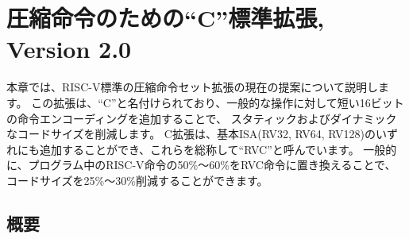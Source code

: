 \begin{comment}
\chapter{``C'' Standard Extension for Compressed Instructions, Version
2.0}
\end{comment}
\chapter{圧縮命令のための``C''標準拡張, Version 2.0}
\label{compressed}

\begin{comment}
This chapter describes the current proposal for the RISC-V
standard compressed instruction-set extension, named ``C'', which
reduces static and dynamic code size by adding short 16-bit
instruction encodings for common operations.  The C extension can be
added to any of the base ISAs (RV32, RV64, RV128), and we use the
generic term ``RVC'' to cover any of these.  Typically, 50\%--60\% of
the RISC-V instructions in a program can be replaced with RVC
instructions, resulting in a 25\%--30\% code-size reduction.
\end{comment}

本章では、RISC-V標準の圧縮命令セット拡張の現在の提案について説明します。
この拡張は、``C''と名付けられており、一般的な操作に対して短い16ビットの命令エンコーディングを追加することで、
スタティックおよびダイナミックなコードサイズを削減します。
C拡張は、基本ISA(RV32, RV64, RV128)のいずれにも追加することができ、これらを総称して``RVC''と呼んでいます。
一般的に、プログラム中のRISC-V命令の50\%～60\%をRVC命令に置き換えることで、
コードサイズを25\%～30\%削減することができます。

\begin{comment}
\section{Overview}
\end{comment}
\section{概要}

\begin{comment}
RVC uses a simple compression scheme that offers shorter 16-bit
versions of common 32-bit RISC-V instructions when:
\begin{tightlist}
	\item the immediate or address offset is small, or
	\item one of the registers is the zero register ({\tt x0}), the
      ABI link register ({\tt x1}), or the ABI stack pointer ({\tt
        x2}), or
	\item the destination register and the first source register are
      identical, or
	\item the registers used are the 8 most popular ones.
\end{tightlist}
\end{comment}

